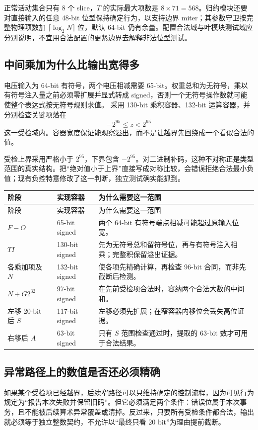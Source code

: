 正常活动集合只有 8 个 slice，\(T\) 的实际最大项数是 \(8\times71=568\)。归约模块还要对直接输入的任意 48-bit 位型保持确定行为，以支持边界 miter；其参数守卫按完整物理项数加 \(\lceil\log_2N\rceil\) 位，默认 64-bit 仍有余量。配置合法域与叶模块测试域应分别说明，不宜用合法配置的更紧边界去解释非法位型测试。

\subsection{中间乘加为什么比输出宽得多}
电压输入为 64-bit 有符号，两个电压相减需要 65-bit。权重总和为无符号，乘以有符号注入量之前必须零扩展并显式转成 signed，否则一个无符号操作数就可能使整个表达式按无符号规则求值。 采用 130-bit 乘积容器、132-bit 运算容器，并分别检查关键项落在
\begin{equation}
-2^{95}\le z<2^{95}
\end{equation}
这一受检域内。容器宽度保证能观察溢出，而不是让越界先回绕成一个看似合法的值。

受检上界采用严格小于 \(2^{95}\)，下界包含 \(-2^{95}\)。对二进制补码，这种不对称正是类型范围的真实结构。把“绝对值小于上界”直接写成对称比较，会错误拒绝合法最小负值；现有负控特意修改了这一判断，独立测试确实能抓到。

\begin{longtable}{p{29mm}p{29mm}p{88mm}}
\toprule 阶段&实现容器&为什么需要这一范围\\\midrule\endfirsthead
\toprule 阶段&实现容器&为什么需要这一范围\\\midrule\endhead
\(F-O\)&65-bit signed&两个 64-bit 有符号端点相减可能超过原输入位宽。\\
\(TI\)&130-bit signed&先为无符号总和留符号位，再与有符号注入相乘；完整积保留溢出证据。\\
各乘加项及 \(N\)&132-bit signed&使各项先精确计算，再检查 96-bit 合同，而非先截断后检测。\\
\(N+G2^{32}\)&97-bit signed&在先前受检项合法时，容纳两个合法大数的中间和。\\
左移 20-bit 后 \(S\)&117-bit signed&左移必须先扩展；在窄容器内移位会丢失高位证据。\\
右移后 \(A\)&63-bit signed&只有 \(S\) 范围检查通过时，提取的 63-bit 数才可用于合法结果。\\
\bottomrule\end{longtable}

\subsection{异常路径上的数值是否还必须精确}
如果某个受检项已经越界，后续窄路径可以只维持确定的控制流程，因为可见行为规定为“报告本次失败并保留旧码”。但它必须满足两个条件：错误位属于本次事务，且不能被后续算术异常覆盖或清掉。反过来，只要所有受检条件都合法，输出就必须等于独立整数契约，不允许以“最终只看 20 bit”为理由提前截断。

